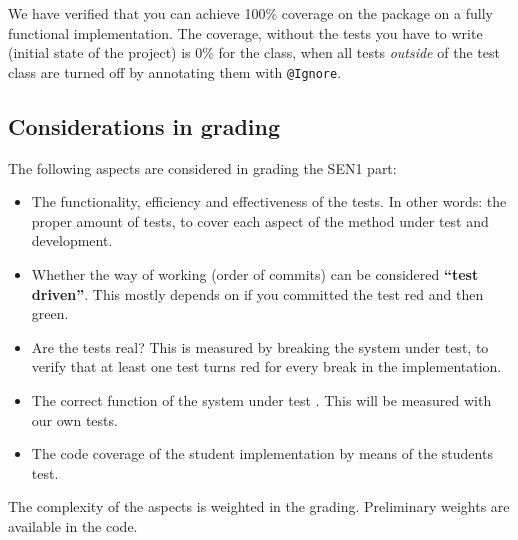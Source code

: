 We have verified that you can achieve 100\% coverage on the
 package on a fully functional implementation.
The coverage, without the tests you have to write (initial state of the
project) is 0\% for the  class, when all tests \textit{outside}
of the test class  are turned off by annotating
them with \lstinline{@Ignore}.

\subsection{Considerations in grading}
The following aspects are considered in grading the SEN1 part:
\begin{itemize}\itemsep1pt\parskip0pt
\item The functionality, efficiency and effectiveness of the
  tests. In other words: the proper amount of tests, to cover each
  aspect of the method under test and development.
\item Whether the way of working (order of commits) can be considered
  \textbf{``test driven''}. This mostly depends on if you committed
  the test red and then green.
\item Are the tests real? This is measured by breaking the system
  under test, to verify that at least one test turns red for every
  break in the implementation.
\item The correct function of the system under test
  . This will be measured with our own tests.
\item The code coverage of the student implementation by means of the
  students test.
\end{itemize}

The complexity of the aspects is weighted in the grading. Preliminary
weights are available in the code.
